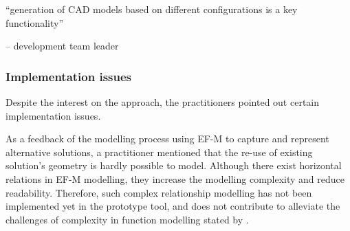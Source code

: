 \documentclass[aerospace,article,submit,moreauthors,pdftex]{Definitions/mdpi}
\begin{document}


\begin{center}
    “generation of CAD models based on different configurations is a key functionality” 
\end{center}
\begin{flushright}
    -- development team leader
\end{flushright}






\subsubsection{Implementation issues }

Despite the interest on the approach, the practitioners pointed out certain implementation issues.


As a feedback of the modelling process using \ac{EF-M} to capture and represent alternative solutions, a practitioner mentioned that the re-use of existing solution's geometry is hardly possible to model.
Although there exist horizontal relations in EF-M modelling, they increase the modelling complexity and reduce readability.
Therefore, such complex relationship modelling has not been implemented yet in the prototype tool, and does not contribute to alleviate the challenges of complexity in function modelling stated by \cite{Muller2020, Tomiyama2013}.
\end{document}

